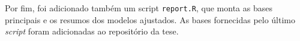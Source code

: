 \documentclass[12pt,twoside,brazilian]{book}
\begin{document}
Por fim, foi adicionado também um script \texttt{report.R}, que monta as
bases principais e os resumos dos modelos ajustados. As bases fornecidas
pelo último \emph{script} foram adicionadas ao repositório da tese.

% 
% 
% 
% 
% 
% 



%
%
%


\makeatletter
\if@openright\cleardoublepage\else\clearpage\fi
\makeatother




% 
\end{document}
